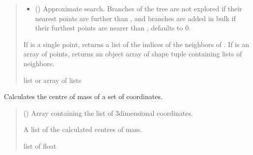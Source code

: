 \documentclass[a4paper,10pt,english]{report}
\begin{document}
\begin{fulllineitems}
\begin{fulllineitems}
\begin{quote}
\begin{description}
\begin{itemize}
\item {} 
\sphinxAtStartPar
{} (\sphinxstyleliteralemphasis{\sphinxupquote{, }}) \textendash{} Approximate search. Branches of the tree are not explored if their
nearest points are further than , and branches are
added in bulk if their furthest points are nearer than
, defaults to 0.

\end{itemize}

\sphinxAtStartPar
If  is a single point, returns a list of the indices of the
neighbors of . If  is an array of points, returns an object
array of shape tuple containing lists of neighbors.

\sphinxAtStartPar
list or array of lists

\end{description}\end{quote}

\end{fulllineitems}


\end{fulllineitems}


\begin{fulllineitems}
\label{\detokenize{NNucleate:NNucleate.utils.com}}
\pysigstartsignatures
{}
\pysigstopsignatures
\sphinxAtStartPar
Calculates the centre of mass of a set of coordinates.
\begin{quote}\begin{description}
\sphinxAtStartPar
{} () \textendash{} Array containing the list of 3\sphinxhyphen{}dimensional coordinates.

\sphinxAtStartPar
A list of the calculated centres of mass.

\sphinxAtStartPar
list of float

\end{description}\end{quote}

\end{fulllineitems}
\end{document}
